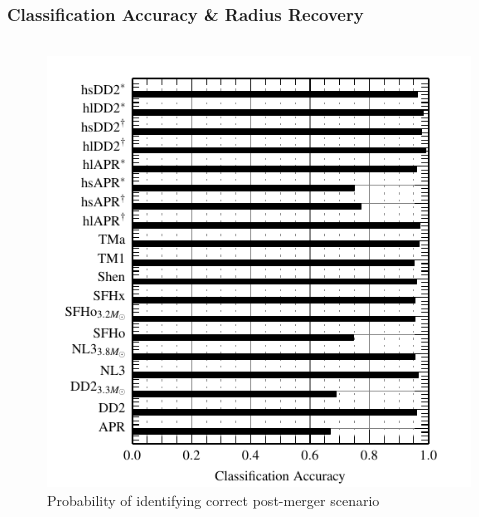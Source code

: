 \documentclass[serif,mathserif,10pt]{beamer}
\let\oldframetitle\frametitle%
\renewcommand{\frametitle}[1]{%
      \oldframetitle{#1}\setstretch{1.2}}
\begin{document}
\begin{frame}
    \frametitle{Classification Accuracy \& Radius Recovery}

    \begin{columns}[]


        \begin{center}
            \vspace{-0.08cm}
            \begin{figure}
                \includegraphics[width=1\columnwidth]{figures/classification.pdf}
                \caption{Probability of identifying correct post-merger scenario}
            \end{figure}
        \end{center}



\end{columns}
\end{frame}
\end{document}
